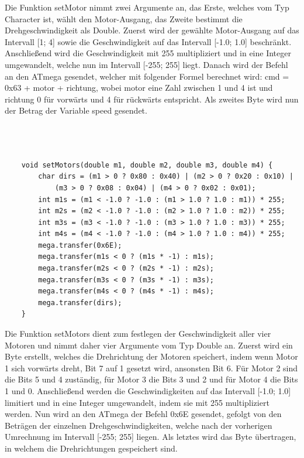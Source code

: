 \documentclass[12pt]{article}
\begin{document}
Die Funktion setMotor nimmt zwei Argumente an, das Erste, welches vom Typ Character ist, wählt den Motor-Ausgang, das Zweite bestimmt die Drehgeschwindigkeit als Double. Zuerst wird der gewählte Motor-Ausgang auf das Intervall [1; 4] sowie die Geschwindigkeit auf das Intervall [-1.0; 1.0] beschränkt. Anschließend wird die Geschwindigkeit mit 255 multipliziert und in eine Integer umgewandelt, welche nun im Intervall [-255; 255] liegt. Danach wird der Befehl an den ATmega gesendet, welcher mit folgender Formel berechnet wird: cmd = 0x63 + motor + richtung, wobei motor eine Zahl zwischen 1 und 4 ist und richtung 0 für vorwärts und 4 für rückwärts entspricht. Als zweites Byte wird nun der Betrag der Variable speed gesendet.\\\\\\\\
\begin{verbatim}
    void setMotors(double m1, double m2, double m3, double m4) {
        char dirs = (m1 > 0 ? 0x80 : 0x40) | (m2 > 0 ? 0x20 : 0x10) |
            (m3 > 0 ? 0x08 : 0x04) | (m4 > 0 ? 0x02 : 0x01);
        int m1s = (m1 < -1.0 ? -1.0 : (m1 > 1.0 ? 1.0 : m1)) * 255;
        int m2s = (m2 < -1.0 ? -1.0 : (m2 > 1.0 ? 1.0 : m2)) * 255;
        int m3s = (m3 < -1.0 ? -1.0 : (m3 > 1.0 ? 1.0 : m3)) * 255;
        int m4s = (m4 < -1.0 ? -1.0 : (m4 > 1.0 ? 1.0 : m4)) * 255;
        mega.transfer(0x6E);
        mega.transfer(m1s < 0 ? (m1s * -1) : m1s);
        mega.transfer(m2s < 0 ? (m2s * -1) : m2s);
        mega.transfer(m3s < 0 ? (m3s * -1) : m3s);
        mega.transfer(m4s < 0 ? (m4s * -1) : m4s);
        mega.transfer(dirs);
    }
\end{verbatim}
Die Funktion setMotors dient zum festlegen der Geschwindigkeit aller vier Motoren und nimmt daher vier Argumente vom Typ Double an. Zuerst wird ein Byte erstellt, welches die Drehrichtung der Motoren speichert, indem wenn Motor 1 sich vorwärts dreht, Bit 7 auf 1 gesetzt wird, ansonsten Bit 6. Für Motor 2 sind die Bits 5 und 4 zuständig, für Motor 3 die Bits 3 und 2 und für Motor 4 die Bits 1 und 0. Anschließend werden die Geschwindigkeiten auf das Intervall [-1.0; 1.0] limitiert und in eine Integer umgewandelt, indem sie mit 255 multipliziert werden. Nun wird an den ATmega der Befehl 0x6E gesendet, gefolgt von den Beträgen der einzelnen Drehgeschwindigkeiten, welche nach der vorherigen Umrechnung im Intervall [-255; 255] liegen. Als letztes wird das Byte übertragen, in welchem die Drehrichtungen gespeichert sind.\\
\end{document}

